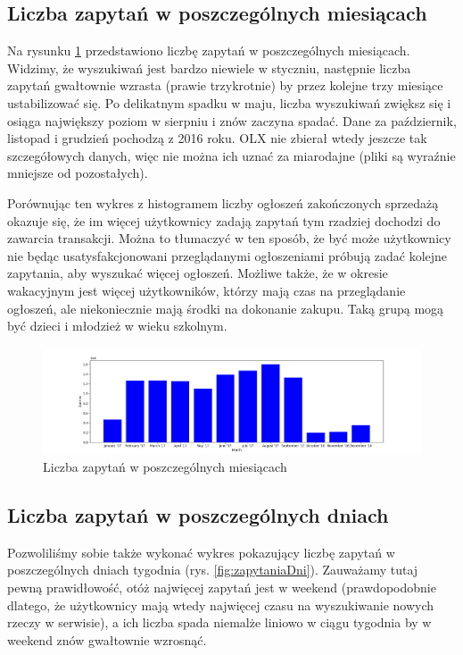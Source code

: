 \documentclass[a4paper,11pt]{article}
\begin{document}
\subsection{Liczba zapytań w poszczególnych miesiącach}
Na rysunku \ref{fig:zapytaniaMiesiace} przedstawiono liczbę zapytań w poszczególnych miesiącach. Widzimy, że wyszukiwań jest bardzo niewiele w styczniu, następnie liczba zapytań gwałtownie wzrasta (prawie trzykrotnie) by przez kolejne trzy miesiące ustabilizować się. Po delikatnym spadku w maju, liczba wyszukiwań zwiększ się i osiąga największy poziom w sierpniu i znów zaczyna spadać. Dane za październik, listopad i grudzień pochodzą z 2016 roku. OLX nie zbierał wtedy jeszcze tak szczegółowych danych, więc nie można ich uznać za miarodajne (pliki są wyraźnie mniejsze od pozostałych). 

Porównując ten wykres z histogramem liczby ogłoszeń zakończonych sprzedażą okazuje się, że im więcej użytkownicy zadają zapytań tym rzadziej dochodzi do zawarcia transakcji. Można to tłumaczyć w ten sposób, że być może użytkownicy nie będąc usatysfakcjonowani przeglądanymi ogłoszeniami próbują zadać kolejne zapytania, aby wyszukać więcej ogłoszeń. Możliwe także, że w okresie wakacyjnym jest więcej użytkowników, którzy mają czas na przeglądanie ogłoszeń, ale niekoniecznie mają środki na dokonanie zakupu. Taką grupą mogą być dzieci i młodzież w wieku szkolnym.

\begin{figure}[!ht]
\centering
\includegraphics[width=1.0\textwidth]{images/liczba_zapytan_w_miesiacach.png}
\caption{\label{fig:zapytaniaMiesiace} Liczba zapytań w poszczególnych miesiącach}
\end{figure}

\subsection{Liczba zapytań w poszczególnych dniach}
Pozwoliliśmy sobie także wykonać wykres pokazujący liczbę zapytań w poszczególnych dniach tygodnia (rys. \ref{fig:zapytaniaDni}). Zauważamy tutaj pewną prawidłowość, otóż najwięcej zapytań jest w weekend (prawdopodobnie dlatego, że użytkownicy mają wtedy najwięcej czasu na wyszukiwanie nowych rzeczy w serwisie), a ich liczba spada niemalże liniowo w ciągu tygodnia by w weekend znów gwałtownie wzrosnąć.
 
\end{document}
